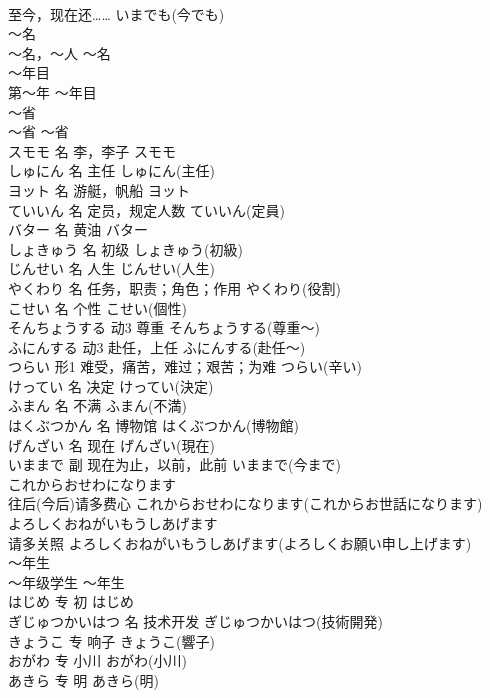 \documentclass[8pt]{extreport}
\begin{document}
\begin{CJK}{UTF8}{min}
\\	至今，现在还……	いまでも(今でも)	
\\	～名	
\\	～名，～人	～名	
\\	～年目	
\\	第～年	～年目	
\\	～省	
\\	～省	～省	
\\	スモモ	名	李，李子	スモモ	
\\	しゅにん	名	主任	しゅにん(主任)	
\\	ヨット	名	游艇，帆船	ヨット	
\\	ていいん	名	定员，规定人数	ていいん(定員)	
\\	バター	名	黄油	バター	
\\	しょきゅう	名	初级	しょきゅう(初級)	
\\	じんせい	名	人生	じんせい(人生)	
\\	やくわり	名	任务，职责；角色；作用	やくわり(役割)	
\\	こせい	名	个性	こせい(個性)	
\\	そんちょうする	动3	尊重	そんちょうする(尊重～)	
\\	ふにんする	动3	赴任，上任	ふにんする(赴任～)	
\\	つらい	形1	难受，痛苦，难过；艰苦；为难	つらい(辛い)	
\\	けってい	名	决定	けってい(決定)	
\\	ふまん	名	不满	ふまん(不満)	
\\	はくぶつかん	名	博物馆	はくぶつかん(博物館)	
\\	げんざい	名	现在	げんざい(現在)	
\\	いままで	副	现在为止，以前，此前	いままで(今まで)	
\\	これからおせわになります	
\\	往后(今后)请多费心	これからおせわになります(これからお世話になります)	
\\	よろしくおねがいもうしあげます	
\\	请多关照	よろしくおねがいもうしあげます(よろしくお願い申し上げます)	
\\	～年生	
\\	～年级学生	～年生	
\\	はじめ	专	初	はじめ	
\\	ぎじゅつかいはつ	名	技术开发	ぎじゅつかいはつ(技術開発)	
\\	きょうこ	专	响子	きょうこ(響子)	
\\	おがわ	专	小川	おがわ(小川)	
\\	あきら	专	明	あきら(明)	

\end{CJK}
\end{document}
